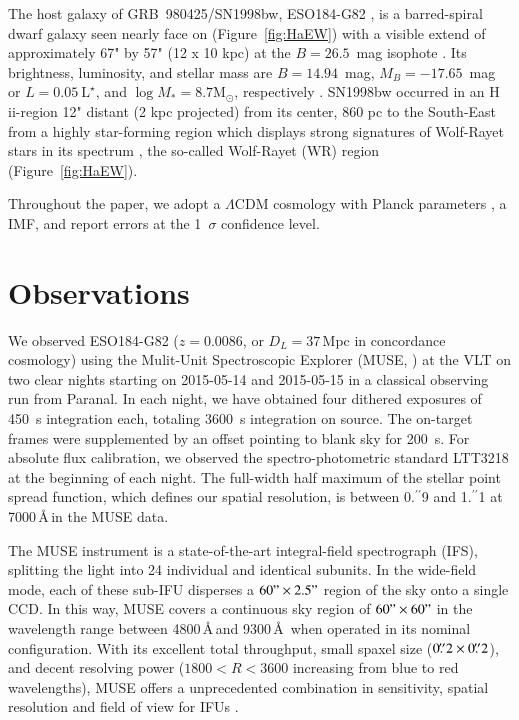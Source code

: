 \documentclass[traditabstract]{aa}
\newcommand{\farc}{\hbox{$.\!\!^{\prime\prime}$}}
\newcommand{\hii}{\mbox{H\,{\sc ii}}}
\begin{document}
The host galaxy of GRB~980425/SN1998bw, ESO184-G82 \citep{1989spce.book.....L}, is a barred-spiral dwarf galaxy \citep{2000ApJ...542L..89F} seen nearly face on (Figure~\ref{fig:HaEW}) with a visible extend of approximately 67" by 57" (12 x 10 kpc) at the $B=26.5$~mag isophote \citep{2005NewA...11..103S}. Its brightness, luminosity, and stellar mass are $B=14.94$~mag, $M_B=-17.65$~mag or $L=0.05~\mathrm{L}^{\star}$, and $\log M_{*}= 8.7 \mathrm{M}_{\odot}$, respectively \citep{2005NewA...11..103S, 2014A&A...562A..70M}. SN1998bw occurred in an \hii-region 12" distant (2 kpc projected) from its center, 860 pc to the South-East from a highly star-forming region which displays strong signatures of Wolf-Rayet stars in its spectrum \citep{2006A&A...454..103H}, the so-called Wolf-Rayet (WR) region (Figure~\ref{fig:HaEW}).

Throughout the paper, we adopt a $\Lambda$CDM cosmology with Planck parameters \citep{2014A&A...571A..16P}, a \citet{2003PASP..115..763C} IMF, and report errors at the 1~$\sigma$ confidence level.

\section{Observations}


We observed ESO184-G82 ($z=0.0086$, or $D_L=37$\,Mpc in concordance cosmology) using the Mulit-Unit Spectroscopic Explorer (MUSE, \citealp{2010SPIE.7735E..08B}) at the VLT on two clear nights starting on 2015-05-14 and 2015-05-15 in a classical observing run from Paranal. In each night, we have obtained four dithered exposures of 450~s integration each, totaling 3600~s integration on source. The on-target frames were supplemented by an offset pointing to blank sky for 200~s. For absolute flux calibration, we observed the spectro-photometric standard LTT3218 at the beginning of each night. The full-width half maximum of the stellar point spread function, which defines our spatial resolution, is between 0\farc{9} and 1\farc{1} at 7000\,\AA\,in the MUSE data.

The MUSE instrument is a state-of-the-art integral-field spectrograph (IFS), splitting the light into 24 individual and identical subunits. In the wide-field mode, each of these sub-IFU disperses a $60"\times 2.5"$ region of the sky onto a single CCD. In this way, MUSE covers a continuous sky region of $60"\times 60"$ in the wavelength range between 4800\,\AA\,and 9300\,\AA\, when operated in its nominal configuration. With its excellent total throughput, small spaxel size ($0\farc{2} \times 0\farc{2}$), and decent resolving power ($1800 < R < 3600$ increasing from blue to red wavelengths), MUSE offers a unprecedented combination in sensitivity, spatial resolution and field of view for IFUs \citep{2010SPIE.7735E..08B}.
\end{document}
